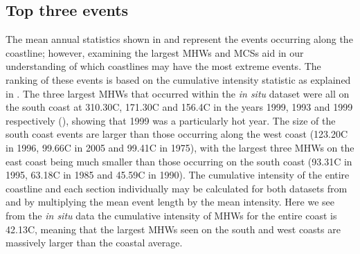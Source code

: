 \documentclass[a4paper,10pt,review]{elsarticle}
\begin{document}
\subsection{Top three events}
The mean annual statistics shown in  and  represent the events occurring along the coastline; however, examining the largest MHWs and MCSs aid in our understanding of which coastlines may have the most extreme events. The ranking of these events is based on the cumulative intensity statistic as explained in . The three largest MHWs that occurred within the \emph{in situ} dataset were all on the south coast at 310.30\degree C, 171.30\degree C and 156.4\degree C in the years 1999, 1993 and 1999 respectively (), showing that 1999 was a particularly hot year. The size of the south coast events are larger than those occurring along the west coast (123.20\degree C in 1996, 99.66\degree C in 2005 and 99.41\degree C in 1975), with the largest three MHWs on the east coast being much smaller than those occurring on the south coast (93.31\degree C in 1995, 63.18\degree C in 1985 and 45.59\degree C in 1990). The cumulative intensity of the entire coastline and each section individually may be calculated for both datasets from  and  by multiplying the mean event length by the mean intensity. Here we see from the \emph{in situ} data the cumulative intensity of MHWs for the entire coast is 42.13\degree C, meaning that the largest MHWs seen on the south and west coasts are massively larger than the coastal average.
\end{document}

